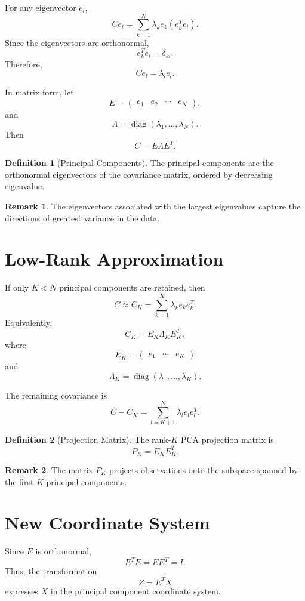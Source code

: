 \documentclass[12pt,oneside]{book}
\numberwithin{equation}{section}
\theoremstyle{definition}
\newtheorem{definition}{Definition}[section]
\newtheorem{remark}{Remark}[section]
\theoremstyle{plain}
\theoremstyle{remark}
\newcommand{\diag}{\operatorname{diag}}
\begin{document}
For any eigenvector $e_l$,
\[
Ce_l
=
\sum_{k=1}^N \lambda_k e_k(e_k^Te_l).
\]
Since the eigenvectors are orthonormal,
\[
e_k^Te_l=\delta_{kl}.
\]
Therefore,
\[
Ce_l
=
\lambda_l e_l.
\]

In matrix form, let
\[
E=
\begin{pmatrix}
e_1 & e_2 & \cdots & e_N
\end{pmatrix},
\]
and
\[
\Lambda=
\diag(\lambda_1,\dots,\lambda_N).
\]
Then
\[
C=E\Lambda E^T.
\]

\begin{definition}[Principal Components]
The principal components are the orthonormal eigenvectors of the covariance matrix, ordered by decreasing eigenvalue.
\end{definition}

\begin{remark}
The eigenvectors associated with the largest eigenvalues capture the directions of greatest variance in the data.
\end{remark}

\section{Low-Rank Approximation}

If only $K<N$ principal components are retained, then
\[
C
\approx
C_K
=
\sum_{k=1}^K \lambda_k e_ke_k^T.
\]
Equivalently,
\[
C_K
=
E_K\Lambda_K E_K^T,
\]
where
\[
E_K=
\begin{pmatrix}
e_1 & \cdots & e_K
\end{pmatrix}
\]
and
\[
\Lambda_K=\diag(\lambda_1,\dots,\lambda_K).
\]

The remaining covariance is
\[
C-C_K
=
\sum_{l=K+1}^N \lambda_l e_le_l^T.
\]

\begin{definition}[Projection Matrix]
The rank-$K$ PCA projection matrix is
\[
P_K=E_KE_K^T.
\]
\end{definition}

\begin{remark}
The matrix $P_K$ projects observations onto the subspace spanned by the first $K$ principal components.
\end{remark}

\section{New Coordinate System}

Since $E$ is orthonormal,
\[
E^TE=EE^T=I.
\]
Thus, the transformation
\[
Z=E^TX
\]
expresses $X$ in the principal component coordinate system.
\end{document}
